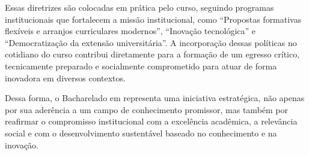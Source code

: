 Essas diretrizes são colocadas em prática pelo curso, seguindo programas institucionais que fortalecem a missão institucional, como ``Propostas formativas flexíveis e arranjos curriculares modernos'', ``Inovação tecnológica'' e ``Democratização da extensão universitária''. A incorporação dessas políticas no cotidiano do curso contribui diretamente para a formação de um egresso crítico, tecnicamente preparado e socialmente comprometido para atuar de forma inovadora em diversos contextos.

Dessa forma, o Bacharelado em \nomedocurso representa uma iniciativa estratégica, não apenas por sua aderência a um campo de conhecimento promissor, mas também por reafirmar o compromisso institucional com a excelência acadêmica, a relevância social e com o desenvolvimento sustentável baseado no conhecimento e na inovação.